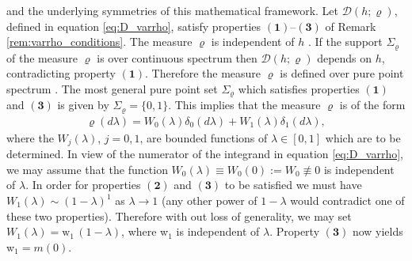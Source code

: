 \documentclass[english,12pt,jmp,graphicx]{revtex4-1}
\begin{document}
and the underlying symmetries of this mathematical framework. Let
$\mathcal{D}(h;\varrho)$, defined in equation \eqref{eq:D_varrho}, satisfy
properties $\mathbf{(1)}$--$\mathbf{(3)}$ of Remark
\ref{rem:varrho_conditions}. The measure $\varrho$ is independent of $h$
\cite{Golden:CMP-473}. If the support $\Sigma_\varrho$ of the measure $\varrho$ is over
continuous spectrum \cite{Reed-1980} then $\mathcal{D}(h;\varrho)$ depends
on $h$, contradicting property $\mathbf{(1)}$. Therefore the measure
$\varrho$ is defined over pure point spectrum
\cite{Reed-1980}. The most general pure point set $\Sigma_\varrho$ which
satisfies properties $\mathbf{(1)}$ and $\mathbf{(3)}$ is given by
$\Sigma_\varrho=\{0,1\}$. This implies that the measure $\varrho$ is of the form  
% 
\begin{align*}
  \varrho(d\lambda)=W_0(\lambda)\delta_0(d\lambda)+W_1(\lambda)\delta_1(d\lambda),
\end{align*}
%
where the $W_j(\lambda)$, $j=0,1$, are bounded functions of $\lambda\in[0,1]$ which are to
be determined. In view of the numerator of the integrand in equation
\eqref{eq:D_varrho}, we may assume that the function
$W_0(\lambda)\equiv W_0(0):=W_0\not\equiv0$ is independent of $\lambda$. In order for
properties $\mathbf{(2)}$ and $\mathbf{(3)}$ to be satisfied we must
have $W_1(\lambda)\sim(1-\lambda)^1$ as $\lambda\to1$ (any other power of $1-\lambda$ would contradict
one of these two properties). Therefore with out loss of generality, we
may set $W_1(\lambda)=\text{w}_1\,(1-\lambda)$, where w$_1$ is independent of
$\lambda$. Property $\mathbf{(3)}$ now yields w$_1=m(0)$. 
\end{document}
